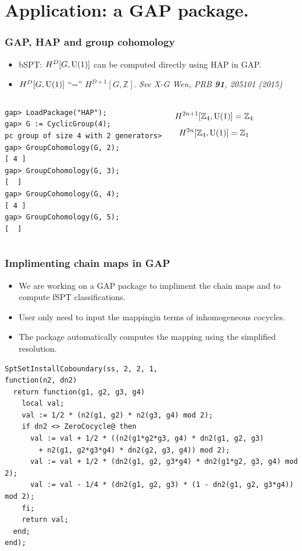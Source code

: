 \documentclass[xcolor=table, aspectratio=43,ignorenonframetext]{beamer}
\newcommand{\uone}{\text U(1)}
\begin{document}
\section{Application: a GAP package.}

\begin{frame}[fragile]
	\frametitle{GAP, HAP and group cohomology}
	\begin{itemize}
		\item bSPT: $H^D[G,\uone]$ can be computed directly using HAP in GAP.
		\item $H^D[G,\uone]$ ``='' $H^{D+1}[G,\mathbb Z]$. \emph{See X-G Wen, PRB \textbf{91}, 205101 (2015)}
	\end{itemize}
	\begin{columns}
	\begin{lstlisting}[basicstyle=\footnotesize]
gap> LoadPackage("HAP");
gap> G := CyclicGroup(4);
pc group of size 4 with 2 generators>
gap> GroupCohomology(G, 2);
[ 4 ]
gap> GroupCohomology(G, 3);
[  ]
gap> GroupCohomology(G, 4);
[ 4 ]
gap> GroupCohomology(G, 5);
[  ]
\end{lstlisting}
	\[H^{2n+1}[\mathbb Z_4,\uone] = \mathbb Z_4\]
	\[H^{2n}[\mathbb Z_4,\uone] = \mathbb Z_1\]
	\end{columns}
\end{frame}

\begin{frame}[fragile]
	\frametitle{Implimenting chain maps in GAP}
	\begin{itemize}
		\item We are working on a GAP package to impliment the chain maps and to compute fSPT classifications.
		\item User only need to input the mappingin terms of inhomogeneous cocycles.
		\item The package automatically computes the mapping using the simplified resolution.
	\end{itemize}
\begin{lstlisting}[basicstyle=\footnotesize,morekeywords={function,return,local,if,fi,then,end},showspaces=false,showtabs=false, keywordstyle=\color{blue}]
SptSetInstallCoboundary(ss, 2, 2, 1,
function(n2, dn2)
  return function(g1, g2, g3, g4)
    local val;
    val := 1/2 * (n2(g1, g2) * n2(g3, g4) mod 2);
    if dn2 <> ZeroCocycle@ then
      val := val + 1/2 * ((n2(g1*g2*g3, g4) * dn2(g1, g2, g3)
        + n2(g1, g2*g3*g4) * dn2(g2, g3, g4)) mod 2);
      val := val + 1/2 * (dn2(g1, g2, g3*g4) * dn2(g1*g2, g3, g4) mod 2);
      val := val - 1/4 * (dn2(g1, g2, g3) * (1 - dn2(g1, g2, g3*g4)) mod 2);
    fi;
    return val;
  end;
end);
\end{lstlisting}
\end{frame}
\end{document}
